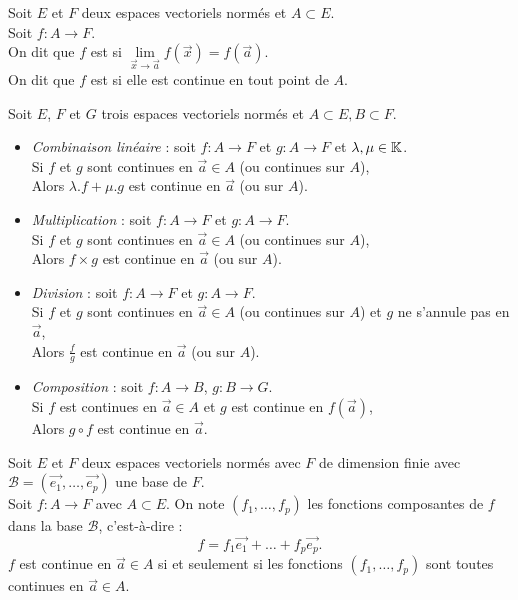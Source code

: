 \documentclass{book}
\begin{document}
\begin{Definition}[Continuité]
Soit $E$ et $F$ deux espaces vectoriels normés et $A\subset E$.\\
Soit $f:A\to F$.\\
On dit que $f$ est  si $\lim\limits_{\vec{x}\to\vec{a} } f(\vec{x})= f(\vec{a})$.\\
On dit que $f$ est  si elle est continue en tout point de $A$.
\end{Definition}
\begin{Proposition}
Soit $E$, $F$ et $G$ trois espaces vectoriels normés et $A\subset E, B\subset F$.
\begin{itemize}
\item \textit{Combinaison linéaire} :  soit $f:A\to F$ et $g:A\to F$ et $\lambda,\mu\in\mathbb{K}$.\\
Si $f$ et $g$ sont continues en $\vec{a}\in A$ (ou continues sur $A$),\\
Alors $\lambda.f + \mu.g$ est continue en $\vec{a}$ (ou sur $A$).
\item\textit{Multiplication} :  soit $f:A\to F$ et $g:A\to F$.\\
Si $f$ et $g$ sont continues en $\vec{a}\in A$ (ou continues sur $A$),\\
Alors $f \times g$ est continue en $\vec{a}$ (ou sur $A$).
\item\textit{Division} :  soit $f:A\to F$ et $g:A\to F$.\\
Si $f$ et $g$ sont continues en $\vec{a}\in A$ (ou continues sur $A$) et $g$ ne s'annule pas en $\vec{a}$,\\
Alors $\frac{f}{g}$ est continue en $\vec{a}$ (ou sur $A$).
\item\textit{Composition} :  soit $f:A\to B$, $g:B\to G$.\\
Si $f$ est continues en $\vec{a}\in A$ et $g$ est continue en $f(\vec{a})$,\\
Alors $g\circ f$ est continue en $\vec{a}$.
\end{itemize}
\end{Proposition}
\begin{Proposition}
Soit $E$ et $F$ deux espaces vectoriels normés avec $F$ de dimension finie avec $\mathcal{B}=(\vec{e_1},\dots, \vec{e_p})$ une base de $F$.\\
Soit $f:A\to F$ avec $A\subset E$.
On note  $(f_1, \dots, f_p)$ les fonctions composantes de $f $dans la base
$\mathcal{B}$, c'est-à-dire : $$f=f_1\vec{e_1}+\dots + f_p\vec{e_p}.$$
$f$ est continue en $\vec{a}\in A$ si et seulement si les fonctions $(f_1, \dots, f_p)$ sont toutes continues en $\vec{a}\in A$.
\end{Proposition}
\end{document}
